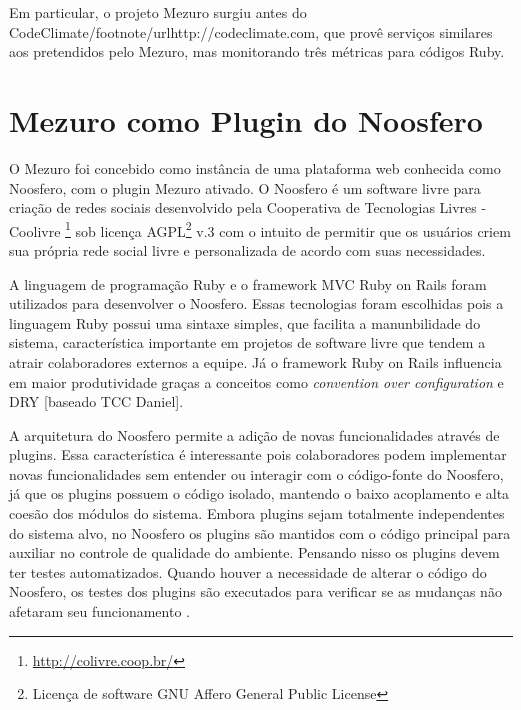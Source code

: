 Em particular, o projeto Mezuro surgiu antes do CodeClimate/footnote{/url{http://codeclimate.com}}, que provê serviços similares aos pretendidos pelo Mezuro, mas monitorando três métricas para códigos Ruby.



\section{Mezuro como Plugin do Noosfero}

O Mezuro foi concebido como instância de uma plataforma web conhecida como Noosfero, com o plugin Mezuro ativado. O Noosfero é um software livre para criação de redes sociais desenvolvido pela Cooperativa de Tecnologias Livres - Coolivre \footnote{\url{http://colivre.coop.br/}} sob licença AGPL\footnote{Licença de software GNU Affero General Public License} v.3 com o intuito de permitir que os usuários criem sua própria rede social livre e personalizada de acordo com suas necessidades.

A linguagem de programação Ruby e o framework MVC Ruby on Rails foram utilizados para desenvolver o Noosfero. Essas tecnologias foram escolhidas pois a linguagem Ruby possui uma sintaxe simples, que facilita a manunbilidade do sistema, característica importante em projetos de software livre que tendem a atrair colaboradores externos a equipe. Já o framework Ruby on Rails influencia em maior produtividade graças a conceitos como \textit{convention over configuration} e DRY [baseado TCC Daniel].

A arquitetura do Noosfero permite a adição de novas funcionalidades através de plugins. Essa característica é interessante pois colaboradores podem implementar novas funcionalidades sem entender ou interagir com o código-fonte do Noosfero, já que os plugins possuem o código isolado, mantendo o baixo acoplamento e alta coesão dos módulos do sistema. Embora plugins sejam totalmente independentes do sistema alvo, no Noosfero os plugins são mantidos com o código principal para auxiliar no controle de qualidade do ambiente. Pensando nisso os plugins devem ter testes automatizados. Quando houver a necessidade de alterar o código do Noosfero, os testes dos plugins são executados para verificar se as mudanças não afetaram seu funcionamento \cite{noosfero2013plugins}.

